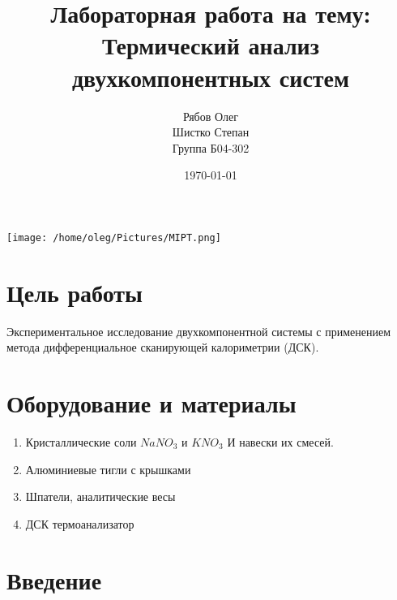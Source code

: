 \documentclass[a4paper,12pt]{article} %
\begin{document}
\begin{titlepage}
  \title{Лабораторная работа на тему: \\        
  Термический анализ двухкомпонентных систем
  }
  \author{Рябов Олег \\
  Шистко Степан\\
  Группа Б04-302}
  \date{\today}
  \maketitle
  \vfill
  \begin{center}
      \texttt{[image: /home/oleg/Pictures/MIPT.png]}
  \end{center}
\end{titlepage}


\section{Цель работы}
Экспериментальное исследование двухкомпонентной системы с применением метода дифференциальное сканирующей калориметрии (ДСК).
\section{Оборудование и материалы}
\begin{enumerate}
    \item Кристаллические соли $NaNO_3$ и $KNO_3$ И навески их смесей.
    \item Алюминиевые тигли с крышками
    \item Шпатели, аналитические весы
    \item ДСК термоанализатор
\end{enumerate}
\section{Введение}
\end{document}
